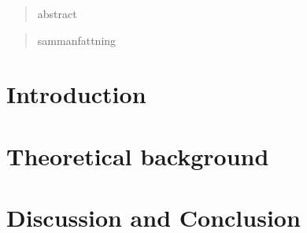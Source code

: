 \documentclass[a4paper, 12pt]{article}
\begin{document}
\begin{abstract}
    abstract
\end{abstract}

\bigskip

\bigskip

\bigskip

\bigskip

\begin{otherlanguage}{swedish}
\begin{abstract}
    sammanfattning
  
\end{abstract}
\end{otherlanguage}


\newpage
\tableofcontents
\newpage
{}

\section{Introduction}



\section{Theoretical background}




\section{Discussion and Conclusion}



\newpage
%

\newpage




\appendix
\end{document}
